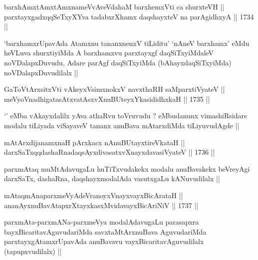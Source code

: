\begin{shl}
barxhAmxtAmx\s \s tAmxnameVvAveVdahaM barxhemxVti ca shurxteVH || \\
parxtayxgadxqqSeTxyXYva tadabxrXhamx daqshayxteV na parAgidhxyA ||  1734 ||  
\end{shl}

\begin{artha}
`barxhamxrUpavAda Atamxnu tananxnenxV tiLiditu' `nAneV barxhamx' eMdu
  heVLuva shurxtiyiMda A barxhamxvu parxtayxgf daqSiTxyiMdaleV
  noVDalapxDuvudu, Adare parAgf daqSiTxyiMda (bAhayxdaqSiTxyiMda)
  noVDalapxDuvudilalx ||
\end{artha}


\begin{shl}
GaToV\s tArxsitxVti vAkeyxV\s simxnokxV navxthaRH saMparxtiVyateV ||  \\
meVyoV\s nadhigatasAtxvatAsxvXnuBUteyxYkasididhxkaH ||  1735 ||  
\end{shl}

\begin{artha}
`\stext' eMba vAkayxdalilx yAva athaRvu toVruvudu ? eMbudanunx
  vimashiRsidare modalu tiLiyada viSayaveV tananx anuBava mAtarxdiMda
  tiLiyuvudAgde ||
\end{artha}

\begin{shl}
mAtArxdijanamxnaH pArxkacx nAnuBUtayxtireVkataH || \\
darxSaTxqqdashaRnadaqsAyxdivasatxvXnayxdavasiVyateV ||  1736 || 
\end{shl}

\begin{artha}
parxmAtaq muMtAdavugaLu huTiTxvudakekx modalu anuBavakekx beVreyAgi
darxSaTx, dashaRna, daqshayxmodalAda vasutxgaLu kANuvudilalx ||
\end{artha}

\begin{shl}
mAtaqmAnaparxmeVyAdeVranoyxVnayxvayxBicArataH ||  \\
ananAyxnuBavAtapxrXtayxkasxMvidavayxBicAriNiV ||  1737 ||  
\end{shl}

\begin{artha}
parxmAta-parxmANa-parxmeVya modalAdavugaLu parasapxra
bayxBicaritavAguvudariMda savxtaMtArxnuBava AguvudariMda
parxtayxgAtamxrUpavAda anuBavavu vayxBicaritavAguvudilalx
(tapupxvudilalx) ||
\end{artha}

